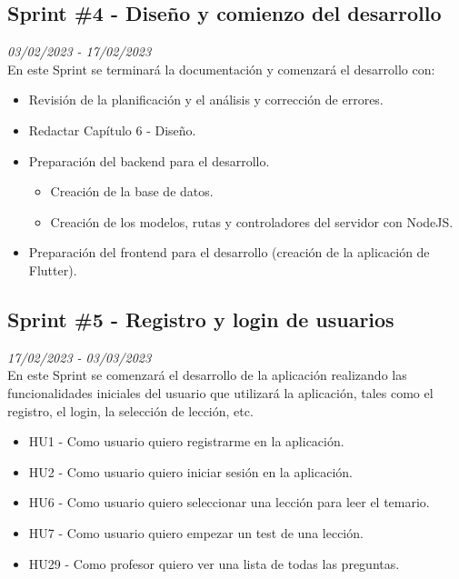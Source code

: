 \subsection{Sprint \#4 - Diseño y comienzo del desarrollo}
\textit{03/02/2023   -   17/02/2023}\\

En este Sprint se terminará la documentación y comenzará el desarrollo con:
\begin{itemize}
    \item Revisión de la planificación y el análisis y corrección de errores.
    \item Redactar Capítulo 6 - Diseño.
    \item Preparación del backend para el desarrollo.
          \begin{itemize}
              \item Creación de la base de datos.
              \item Creación de los modelos, rutas y controladores del servidor con NodeJS.
          \end{itemize}
    \item Preparación del frontend para el desarrollo (creación de la aplicación de Flutter).
\end{itemize}

\subsection{Sprint \#5 - Registro y login de usuarios}
\textit{17/02/2023   -   03/03/2023}\\

En este Sprint se comenzará el desarrollo de la aplicación realizando las funcionalidades iniciales del usuario
que utilizará la aplicación, tales como el registro, el login, la selección de lección, etc.
\begin{itemize}
    \item HU1 - Como usuario quiero registrarme en la aplicación.
    \item HU2 - Como usuario quiero iniciar sesión en la aplicación.
    \item HU6 - Como usuario quiero seleccionar una lección para leer el temario.
    \item HU7 - Como usuario quiero empezar un test de una lección.
    \item HU29 - Como profesor quiero ver una lista de todas las preguntas.

\end{itemize}


